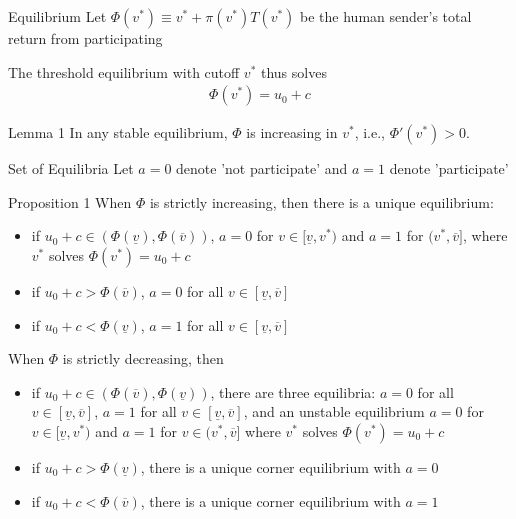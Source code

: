 \documentclass[11pt,aspectratio=169]{beamer}
\begin{document}
\begin{frame}{Equilibrium}
Let $\Phi(v^*)\equiv v^* + \pi(v^*)T(v^*)$ be the human sender's total return from participating
\vspace{1em}

The threshold equilibrium with cutoff $v^*$ thus solves
\begin{align*}
    \Phi(v^*) = u_0+c
\end{align*}


\begin{exampleblock}{Lemma 1}
    In any stable equilibrium, $\Phi$ is increasing in $v^*$, i.e., $\Phi'(v^*)>0$. 
\end{exampleblock}
\end{frame}


\begin{frame}{Set of Equilibria}
\vspace{-.5em}
Let $a=0$ denote 'not participate' and $a=1$ denote 'participate'
\begin{exampleblock}{Proposition 1}
    When $\Phi$ is strictly increasing, then there is a unique equilibrium:
    \begin{itemize}
        \item if $u_0+c\in(\Phi(\underline{v}),\Phi(\overline{v}))$, $a=0$ for $v\in[\underline{v},v^*)$ and $a=1$ for $(v^*,\overline{v}]$, where $v^*$ solves $\Phi(v^*)=u_0+c$
        \item if $u_0+c>\Phi(\overline{v})$, $a=0$ for all $v\in[\underline{v},\overline{v}]$
        \item if $u_0+c<\Phi(\underline{v})$, $a=1$ for all $v\in[\underline{v},\overline{v}]$
    \end{itemize}
    When $\Phi$ is strictly decreasing, then 
    \begin{itemize}
        \item if $u_0+c\in (\Phi(\overline{v}),\Phi(\underline{v}))$, there are three equilibria: $a=0$ for all $v\in[\underline{v},\overline{v}]$, $a=1$ for all $v\in [\underline{v},\overline{v}]$, and an unstable equilibrium $a=0$ for $v\in [\underline{v},v^*)$ and $a=1$ for $v\in(v^*,\overline{v}]$ where $v^*$ solves $\Phi(v^*)=u_0+c$
        \item if $u_0+c>\Phi(\underline{v})$, there is a unique corner equilibrium with $a=0$
        \item if $u_0+c<\Phi(\overline{v})$, there is a unique corner equilibrium with $a=1$
    \end{itemize}
\end{exampleblock}

\end{frame}
\end{document}
